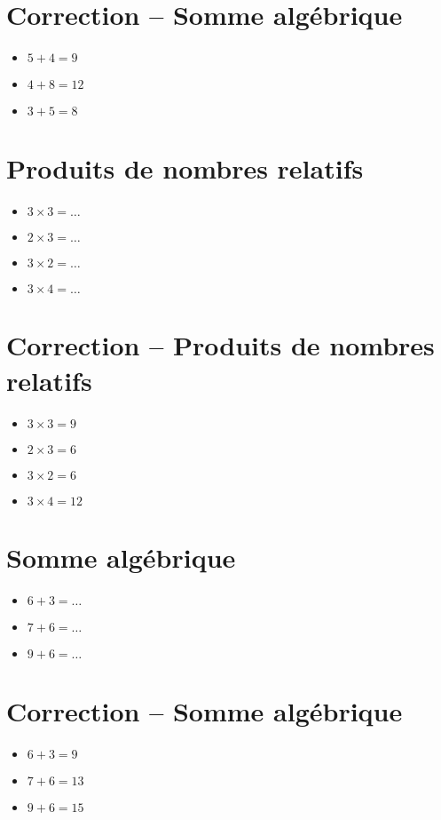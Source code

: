 \documentclass[a4paper,11pt,fleqn]{article}
\begin{document}
\section{Correction -- Somme algébrique}
\begin{itemize}

  \item $5+4=9$
  \item $4+8=12$
  \item $3+5=8$
\end{itemize}

\section{Produits de nombres relatifs}
\begin{itemize}

  \item $3\times3=\ldots$
  \item $2\times3=\ldots$
  \item $3\times2=\ldots$
  \item $3\times4=\ldots$
\end{itemize}

\section{Correction -- Produits de nombres relatifs}
\begin{itemize}

  \item $3\times3=9$
  \item $2\times3=6$
  \item $3\times2=6$
  \item $3\times4=12$
\end{itemize}
\newpage
\setcounter{exo}{0}
\setcounter{section}{0}
\section{Somme algébrique}
\begin{itemize}

3
3
3
3
3
3
3
3
3
3
  \item $6+3=\ldots$
  \item $7+6=\ldots$
  \item $9+6=\ldots$
\end{itemize}

\section{Correction -- Somme algébrique}
\begin{itemize}

  \item $6+3=9$
  \item $7+6=13$
  \item $9+6=15$
\end{itemize}
\end{document}
